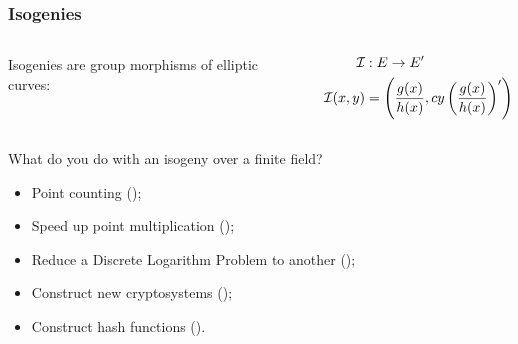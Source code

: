 \documentclass[10pt]{beamer}
\begin{document}

\begin{frame}
  \frametitle{Isogenies}
  
  \begin{columns}
    \begin{column}{0.5\textwidth}
      Isogenies are group morphisms of elliptic curves:
    \end{column}
    \begin{column}{0.5\textwidth}
      \begin{align*}
        \mathcal{I}      &:E\rightarrow E'\\
        \mathcal{I}(x,y) &= \left(\frac{g(x)}{h(x)}, cy\left(\frac{g(x)}{h(x)}\right)'\right)
      \end{align*}
    \end{column}
  \end{columns}

  \begin{block}{What do you do with an isogeny over a finite field?}
    \begin{itemize}
    \item Point counting (\cite{schoof95});
    \item Speed up point multiplication (\cite{gallant+lambert+vanstone01});
    \item Reduce a Discrete Logarithm Problem to another (\cite{gaudry+hess+smart02,smith09});
    \item Construct new cryptosystems (\cite{teske06,rostovtsev+stolbunov06});
    \item Construct hash functions (\cite{charles+lauter+goren09}).
    \end{itemize}
  \end{block}
\end{frame}

\end{document}
